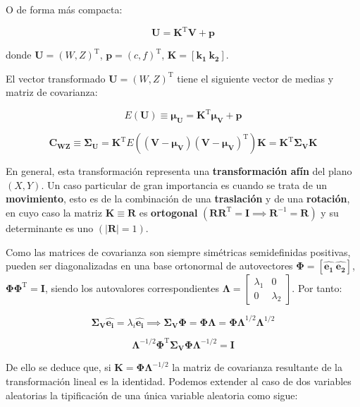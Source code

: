 \documentclass[11pt]{article}
\begin{document}
O de forma más compacta:

\[
\mathbf{U} = \mathbf{K}^\mathrm{T}\mathbf{V}+\mathbf{p}
\]

donde \(\mathbf{U}=(W, Z)^\mathrm{T}\),
\(\mathbf{p}=(c, f)^\mathrm{T}\),
\(\mathbf{K} = \left[\mathbf{k_1} \ \mathbf{k_2} \right]\).

    El vector transformado \(\mathbf{U}=(W, Z)^\mathrm{T}\) tiene el
siguiente vector de medias y matriz de covarianza:

\[
E(\mathbf{U}) \equiv \boldsymbol{\mu_U} = \mathbf{K}^\mathrm{T}\boldsymbol{\mu_V}+\mathbf{p}
\]

\[
\mathbf{C_{WZ}}\equiv \boldsymbol{\Sigma_U} = \mathbf{K}^\mathrm{T}E\left((\mathbf{V}-\boldsymbol{\mu_V})(\mathbf{V}-\boldsymbol{\mu_V})^\mathrm{T} \right)\mathbf{K}=\mathbf{K}^\mathrm{T}\boldsymbol{\Sigma_V}\mathbf{K}
\]

En general, esta transformación representa una \textbf{transformación
afín} del plano \((X,Y)\). Un caso particular de gran importancia es
cuando se trata de un \textbf{movimiento}, esto es de la combinación de
una \textbf{traslación} y de una \textbf{rotación}, en cuyo caso la
matriz \(\mathbf{K} \equiv \mathbf{R}\) es \textbf{ortogonal}
\(\left(\mathbf{RR}^\mathrm{T} = \mathbf{I} \implies \mathbf{R}^{-1} = \mathbf{R}\right)\)
y su determinante es uno \(\left(| \mathbf{R}| =1 \right)\).

    Como las matrices de covarianza son siempre simétricas semidefinidas
positivas, pueden ser diagonalizadas en una base ortonormal de
autovectores
\(\boldsymbol\Phi = \left[\hat{\mathbf{e_1}} \ \hat{\mathbf{e_2}}\right]\),
\(\boldsymbol{\Phi\Phi}^\mathrm{T}=\mathbf{I}\), siendo los autovalores
correspondientes
\(\boldsymbol{\Lambda}= \left[ \begin{array}{cc}{\lambda_1} & {0} \\ {0} & {\lambda_2}\end{array}\right]\).
Por tanto:

\[\boldsymbol{\Sigma_V}\hat{\mathbf{e_i}}=\lambda_i\hat{\mathbf{e_i}}\implies 
\boldsymbol{\Sigma_V}\boldsymbol{\Phi}=\boldsymbol{\Phi\Lambda}=\boldsymbol{\Phi\Lambda}^{1/2}\boldsymbol{\Lambda}^{1/2}\]

\[
\boldsymbol{\Lambda}^{-1/2}\boldsymbol{\Phi}^\mathrm{T}\boldsymbol{\Sigma_V}\boldsymbol{\Phi}\boldsymbol{\Lambda}^{-1/2}=\mathbf{I}
\]

De ello se deduce que, si
\(\mathbf{K}=\boldsymbol{\Phi}\boldsymbol{\Lambda}^{-1/2}\) la matriz de
covarianza resultante de la transformación lineal es la identidad.
Podemos extender al caso de dos variables aleatorias la tipificación de
una única variable aleatoria como sigue:
\end{document}

